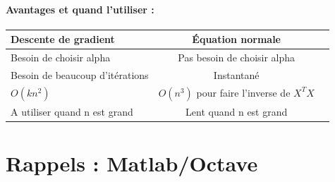 \documentclass{article}
\theoremstyle{definition}
\begin{document}
\paragraph{Avantages et quand l'utiliser :}
\begin{center}
\begin{tabular}{|l|c|r|}
  \hline
  Descente de gradient  & Équation normale \\
  \hline
  Besoin de choisir alpha & Pas besoin de choisir alpha \\
  Besoin de beaucoup d'itérations & Instantané \\
  $O(kn^2)$ & $O(n^3)$ pour faire l'inverse de $X^{T}X$ \\
  A utiliser quand n est grand & Lent quand n est grand \\
  \hline
\end{tabular}
\end{center}
\newpage
\section{Rappels : Matlab/Octave}
\end{document}
